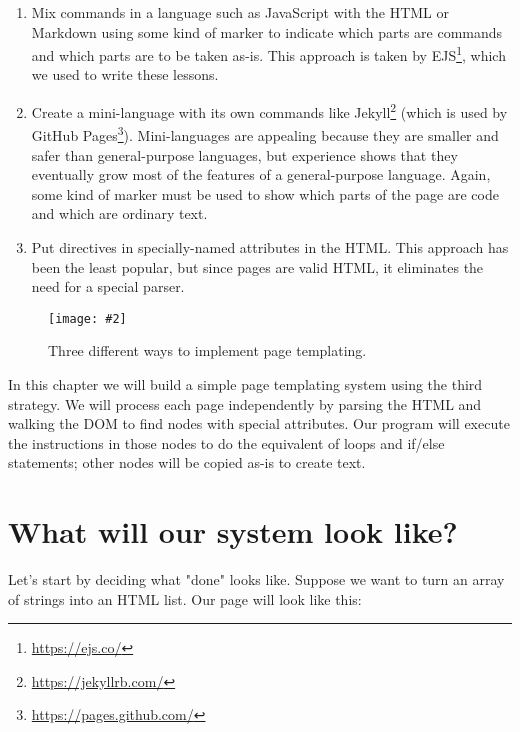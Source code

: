 \documentclass[krantzl]{krantz}
\newcommand{\figpdf}[4]{\begin{figure}%
\centering%
\texttt{[image: \#2]}%
\caption{#3}%
\label{#1}%
\end{figure}}
\newcommand{\hreffoot}[2]{{#1}\footnote{\href{#2}{#2}}}
\begin{document}
\begin{enumerate}

\item 

Mix commands in a language such as JavaScript with the HTML or Markdown
    using some kind of marker to indicate which parts are commands
    and which parts are to be taken as-is.
    This approach is taken by \hreffoot{EJS}{https://ejs.co/},
    which we used to write these lessons.



\item 

Create a mini-language with its own commands like \hreffoot{Jekyll}{https://jekyllrb.com/}
    (which is used by \hreffoot{GitHub Pages}{https://pages.github.com/}).
    Mini-languages are appealing because they are smaller and safer than general-purpose languages,
    but experience shows that they eventually grow
    most of the features of a general-purpose language.
    Again, some kind of marker must be used to show
    which parts of the page are code and which are ordinary text.



\item 

Put directives in specially-named attributes in the HTML.
    This approach has been the least popular,
    but since pages are valid HTML,
    it eliminates the need for a special parser.



\end{enumerate}

\figpdf{page-templates-options}{./page-templates/options.pdf}{Three different ways to implement page templating.}{0.6}


In this chapter we will build a simple page templating system using the third strategy.
We will process each page independently by parsing the HTML
and walking the DOM to find nodes with special attributes.
Our program will execute the instructions in those nodes
to do the equivalent of loops and if/else statements;
other nodes will be copied as-is to create text.


\section{What will our system look like?}\label{page-templates-syntax}


Let's start by deciding what "done" looks like.
Suppose we want to turn an array of strings into an HTML list.
Our page will look like this:
\end{document}
